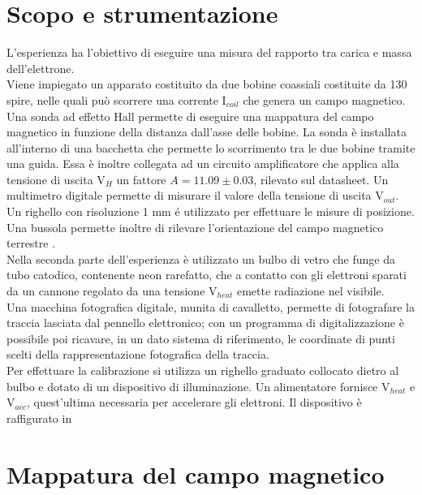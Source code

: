\section{Scopo e strumentazione}

L'esperienza ha l'obiettivo di eseguire una misura del rapporto tra carica e massa dell'elettrone.\\
 Viene impiegato un apparato costituito da due bobine coassiali costituite da 130 spire, nelle quali può scorrere una corrente I$_{coil}$ che genera un campo magnetico. Una sonda ad effetto Hall permette di eseguire una mappatura del campo magnetico in funzione della distanza dall'asse delle bobine. La sonda è installata all'interno di una bacchetta che permette lo scorrimento tra le due bobine tramite una guida. Essa è inoltre collegata ad un circuito amplificatore che applica alla tensione di uscita V$_H$ un fattore $A = 11.09 \pm 0.03$, rilevato sul datasheet. Un multimetro digitale permette di misurare il valore della tensione di uscita V$_{out}$.\\
  Un righello con risoluzione 1 mm é utilizzato per effettuare le misure di posizione. Una bussola permette inoltre di rilevare l'orientazione del campo magnetico terrestre .\\
   Nella seconda parte dell'esperienza è utilizzato un bulbo di vetro che funge da tubo catodico, contenente neon rarefatto, che a contatto con gli elettroni sparati da un cannone regolato da una tensione V$_{heat }$ emette radiazione nel visibile.\\
    Una macchina fotografica digitale, munita di cavalletto, permette di fotografare la traccia lasciata dal pennello elettronico; con un programma di digitalizzazione è possibile poi ricavare, in un dato sistema di riferimento, le coordinate di punti scelti della rappresentazione fotografica della traccia.\\
     Per effettuare la calibrazione si utilizza un righello graduato collocato dietro al bulbo e dotato di un dispositivo di illuminazione. Un alimentatore fornisce V$_{heat}$ e V$_{acc}$, quest'ultima necessaria per accelerare gli elettroni. Il dispositivo è raffigurato in 
\section{Mappatura del campo magnetico}

